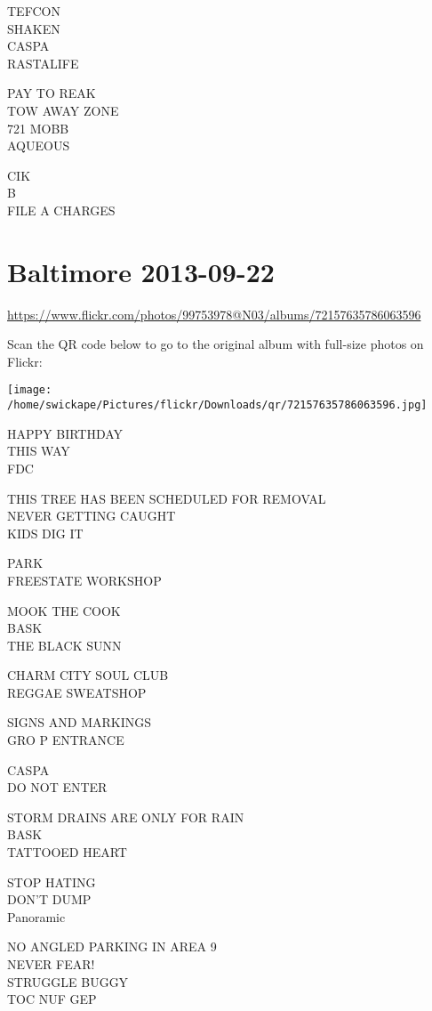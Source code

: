 \documentclass[10pt,letterpaper]{article}
\begin{document}
TEFCON\\
SHAKEN\\
CASPA\\
RASTALIFE

PAY TO REAK\\
TOW AWAY ZONE\\
721 MOBB\\
AQUEOUS

CIK\\
B\\
FILE A CHARGES


\section*{Baltimore 2013-09-22}

\url{https://www.flickr.com/photos/99753978@N03/albums/72157635786063596}

Scan the QR code below to go to the original album with full-size photos on Flickr:

\texttt{[image: /home/swickape/Pictures/flickr/Downloads/qr/72157635786063596.jpg]}


HAPPY BIRTHDAY\\
THIS WAY\\
FDC

THIS TREE HAS BEEN SCHEDULED FOR REMOVAL\\
NEVER GETTING CAUGHT\\
KIDS DIG IT

PARK\\
FREESTATE WORKSHOP

MOOK THE COOK\\
BASK\\
THE BLACK SUNN

CHARM CITY SOUL CLUB\\
REGGAE SWEATSHOP

SIGNS AND MARKINGS\\
GRO P ENTRANCE

CASPA\\
DO NOT ENTER

STORM DRAINS ARE ONLY FOR RAIN\\
BASK\\
TATTOOED HEART

STOP HATING\\
DON'T DUMP\\
Panoramic

NO ANGLED PARKING IN AREA 9\\
NEVER FEAR!\\
STRUGGLE BUGGY\\
TOC NUF GEP
\end{document}
